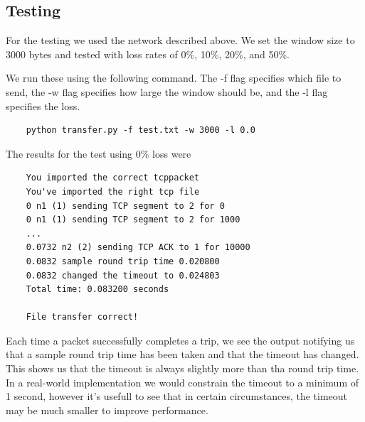 \documentclass[11pt]{article}
\begin{document}
\vspace{5mm}

\subsection{Testing}

For the testing we used the network described above. We set the window size to 3000 bytes and tested with loss rates of 0\%, 10\%, 20\%, and 50\%.

\vspace{5mm}

We run these using the following command. The -f flag specifies which file to send, the -w flag specifies how large the window should be, and the -l flag specifies the loss.

\vspace{5mm}

\begin{lstlisting}
    python transfer.py -f test.txt -w 3000 -l 0.0
\end{lstlisting}

\vspace{5mm}

The results for the test using 0\% loss were 

\vspace{5mm}

\begin{lstlisting}
    You imported the correct tcppacket
    You've imported the right tcp file
    0 n1 (1) sending TCP segment to 2 for 0
    0 n1 (1) sending TCP segment to 2 for 1000
    ...
    0.0732 n2 (2) sending TCP ACK to 1 for 10000
    0.0832 sample round trip time 0.020800
    0.0832 changed the timeout to 0.024803
    Total time: 0.083200 seconds

    File transfer correct!
\end{lstlisting}

\vspace{5mm}

Each time a packet successfully completes a trip, we see the output notifying us that a sample round trip time has been taken and that the timeout has changed. This shows us that the timeout is always slightly more than tha round trip time. In a real-world implementation we would constrain the timeout to a minimum of 1 second, however it's usefull to see that in certain circumstances, the timeout may be much smaller to improve performance.

\vspace{5mm}
\end{document}
